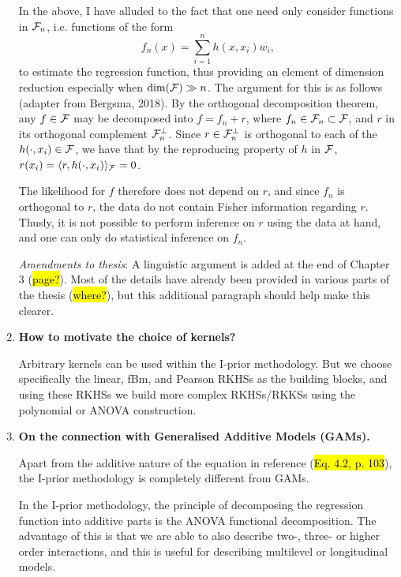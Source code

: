 \documentclass[11pt,showframe]{report}
\begin{document}
\begin{enumerate}
  In the above, I have alluded to the fact that one need only consider functions in ${\mathcal F}_n$, i.e. functions of the form
  \begin{equation}
    f_n(x) = \sum_{i=1}^n h(x,x_i)w_i,
  \end{equation}
  to estimate the regression function, thus providing an element of dimension reduction especially when $\dim({\mathcal F}) \gg n$.
  The argument for this is as follows (adapter from Bergsma, 2018).
  By the orthogonal decomposition theorem, any $f\in{\mathcal F}$ may be decomposed into $f = f_n + r$, where $f_n\in{\mathcal F}_n\subset {\mathcal F}$, and $r$ in its orthogonal complement ${\mathcal F}_n^\bot$.
  Since $r\in{\mathcal F}_n^\bot$ is orthogonal to each of the $h(\cdot,x_i)\in{\mathcal F}$, we have that by the reproducing property of $h$ in ${\mathcal F}$, $r(x_i)=\langle r, h(\cdot,x_i)\rangle_{\mathcal F}=0$.
  
  The likelihood for $f$ therefore does not depend on $r$, and since $f_n$ is orthogonal to $r$, the data do not contain Fisher information regarding $r$.
  Thusly, it is not possible to perform inference on $r$ using the data at hand, and one can only do statistical inference on $f_n$.
  
  \textit{Amendments to thesis}: A linguistic argument is added at the end of Chapter 3 (\hl{page?}). Most of the details have already been provided in various parts of the thesis (\hl{where?}), but this additional paragraph should help make this clearer.
  
  \item \textbf{How to motivate the choice of kernels?}
  
  Arbitrary kernels can be used within the I-prior methodology. 
  But we choose specifically the linear, fBm, and Pearson RKHSs as the building blocks, and using these RKHSs we build more complex RKHSs/RKKSs using the polynomial or ANOVA construction.
  
  \item \textbf{On the connection with Generalised Additive Models (GAMs).}
  
  Apart from the additive nature of the equation in reference (\hl{Eq. 4.2, p. 103}), the I-prior methodology is completely different from GAMs.
  
  In the I-prior methodology, the principle of decomposing the regression function into additive parts is the ANOVA functional decomposition.
  The advantage of this is that we are able to also describe two-, three- or higher order interactions, and this is useful for describing multilevel or longitudinal models.
  

\end{enumerate}
\end{document}
